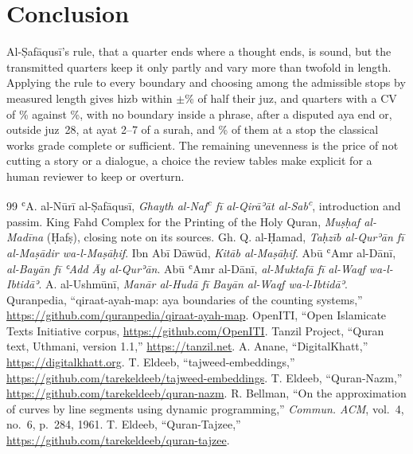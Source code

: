 \documentclass[conference]{IEEEtran}
\begin{document}
\section{Conclusion}
Al-Ṣafāqusī's rule, that a quarter ends where a thought ends, is sound, but the transmitted
quarters keep it only partly and vary more than twofold in length. Applying the rule to every
boundary and choosing among the admissible stops by measured length gives hizb within
$\pm$\NewHizbWorst\% of half their juz, and quarters with a CV of \NewRubCV\% against
\TradRubCV\%, with no boundary inside a phrase, after a disputed aya end or, outside juz~28, at ayat 2--7 of a surah, and \GradeNewStrong\% of them at a stop the classical works grade complete or sufficient. The remaining unevenness
is the price of not cutting a story or a dialogue, a choice the review tables make explicit
for a human reviewer to keep or overturn.

\begin{thebibliography}{99}
 ʿA. al-Nūrī al-Ṣafāqusī, \emph{Ghayth al-Naf\textsuperscript{c} fī al-Qirāʾāt al-Sab\textsuperscript{c}}, introduction and passim.
 King Fahd Complex for the Printing of the Holy Quran, \emph{Muṣḥaf al-Madīna} (Ḥafṣ), closing note on its sources.
 Gh. Q. al-Ḥamad, \emph{Taḥzīb al-Qurʾān fī al-Maṣādir wa-l-Maṣāḥif}.
 Ibn Abī Dāwūd, \emph{Kitāb al-Maṣāḥif}.
 Abū ʿAmr al-Dānī, \emph{al-Bayān fī ʿAdd Āy al-Qurʾān}.
 Abū ʿAmr al-Dānī, \emph{al-Muktafā fī al-Waqf wa-l-Ibtidāʾ}.
 A. al-Ushmūnī, \emph{Manār al-Hudā fī Bayān al-Waqf wa-l-Ibtidāʾ}.
 Quranpedia, ``qiraat-ayah-map: aya boundaries of the counting systems,'' \url{https://github.com/quranpedia/qiraat-ayah-map}.
 OpenITI, ``Open Islamicate Texts Initiative corpus, \url{https://github.com/OpenITI}.
 Tanzil Project, ``Quran text, Uthmani, version 1.1,'' \url{https://tanzil.net}.
 A. Anane, ``DigitalKhatt,'' \url{https://digitalkhatt.org}.
 T. Eldeeb, ``tajweed-embeddings,'' \url{https://github.com/tarekeldeeb/tajweed-embeddings}.
 T. Eldeeb, ``Quran-Nazm,'' \url{https://github.com/tarekeldeeb/quran-nazm}.
 R. Bellman, ``On the approximation of curves by line segments using dynamic programming,'' \emph{Commun. ACM}, vol.~4, no.~6, p.~284, 1961.
 T. Eldeeb, ``Quran-Tajzee,'' \url{https://github.com/tarekeldeeb/quran-tajzee}.
\end{thebibliography}
\end{document}
